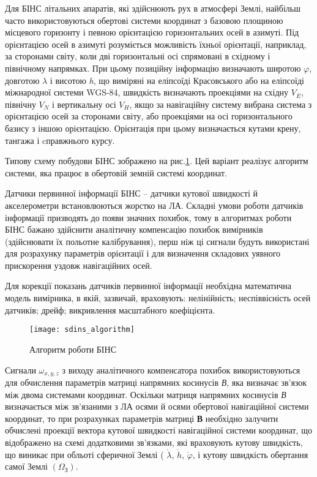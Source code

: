 Для БІНС літальних апаратів, які здійснюють рух в атмосфері Землі, найбільш часто 
використовуються обертові системи координат з базовою площиною місцевого горизонту 
і певною орієнтацією горизонтальних осей в азимуті. Під орієнтацією осей в азимуті 
розуміється можливість їхньої орієнтації, наприклад, за сторонами світу, коли дві 
горизонтальні осі спрямовані в східному і північному напрямках. При цьому позиційну 
інформацію визначають широтою $\varphi$, довготою $\lambda$ і висотою \textit{h}, 
що виміряні на еліпсоїді Красовського або на еліпсоїді міжнародної системи WGS-84, 
швидкість визначають проекціями на східну $V_E$, північну $V_N$ і вертикальну 
осі $V_H$, якщо за навігаційну систему вибрана система з орієнтацією осей за 
сторонами світу, або проекціями на осі горизонтального базису з іншою орієнтацією. 
Орієнтація при цьому визначається кутами крену, тангажа і cправжнього курсу.

Типову схему побудови БІНС зображено на рис.\ref{fig:sdins}. Цей варіант реалізує алгоритм системи, 
яка працює в обертовій земній системі координат.

Датчики первинної інформації БІНС -- датчики кутової швидкості й акселерометри встановлюються 
жорстко на ЛА. Складні умови роботи датчиків інформації призводять до появи значних 
похибок, тому в алгоритмах роботи БІНС бажано здійснити аналітичну компенсацію похибок 
вимірників (здійснювати їх польотне калібрування), перш ніж ці сигнали будуть використані 
для розрахунку параметрів орієнтації і для визначення складових уявного прискорення 
уздовж навігаційних осей.

Для корекції показань датчиків первинної інформації необхідна математична модель 
вимірника, в якій, зазвичай, враховують: нелінійність; неспіввісність осей датчиків; 
дрейф; викривлення масштабного коефіцієнта.
\begin{figure}[here]
\centering
\texttt{[image: sdins\_algorithm]}
\caption{Алгоритм роботи БІНС}
\label{fig:sdins}
\end{figure} 
Сигнали $\omega_{x,y,z}$ з виходу аналітичного компенсатора похибок використовуються 
для обчислення параметрів матриці напрямних  косинусів \textit{В}, яка визначає зв'язок 
між двома системами координат. Оскільки матриця напрямних  косинусів \textit{В} визначається 
між зв'язаними з ЛА осями й осями обертової навігаційної системи координат, то при 
розрахунках параметрів матриці \textbf{В }необхідно залучити обчислені проекції вектора 
кутової швидкості навігаційної системи координат, що відображено на схемі додатковими 
зв'язками, які враховують кутову швидкість, що виникає при обльоті сферичної Землі (
$\dot{\lambda }$, $\dot{h}$, $\dot{\varphi }$, і кутову швидкість обертання самої 
Землі $(\Omega_{\text{З}} )$.

